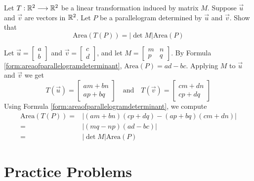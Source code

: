 \documentclass{ximera}
\begin{document}
\begin{example}\label{ex:detLinTransArea}
    Let $T:\mathbb{R}^2\longrightarrow\mathbb{R}^2$ be a linear transformation induced by matrix $M$.  Suppose $\vec{u}$ and $\vec{v}$ are vectors in $\mathbb{R}^2$.  Let $P$ be a parallelogram determined by $\vec{u}$ and $\vec{v}$.  Show that 
    $$\mbox{Area}(T(P))=\left|\det{M}\right|\mbox{Area}(P)$$
    \begin{explanation}
        Let $\vec{u}=\begin{bmatrix}a\\b\end{bmatrix}$ and $\vec{v}=\begin{bmatrix}c\\d\end{bmatrix}$, and let $M=\begin{bmatrix}m & n\\p & q\end{bmatrix}$.  By Formula \ref{form:areaofparallelogramdeterminant}, $\mbox{Area}(P)=ad-bc$.  Applying $M$ to $\vec{u}$ and $\vec{v}$ we get 
        $$T(\vec{u})=\begin{bmatrix}am+bn\\ap+bq\end{bmatrix}\quad\mbox{and}\quad T(\vec{v})=\begin{bmatrix}cm+dn\\cp+dq\end{bmatrix}$$
        Using Formula \ref{form:areaofparallelogramdeterminant}, we compute
        \begin{align*}
        \mbox{Area}(T(P))=&|(am+bn)(cp+dq)-(ap+bq)(cm+dn)|\\
        =&|(mq-np)(ad-bc)|\\
        =&|\det{M}|\mbox{Area}(P)
        \end{align*}
    \end{explanation}
\end{example}

\section*{Practice Problems}
\end{document}
